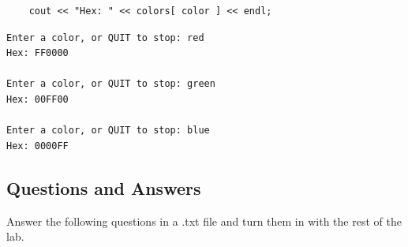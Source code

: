 \documentclass[a4paper,12pt]{book}
\begin{document}
\begin{verbatim}
    cout << "Hex: " << colors[ color ] << endl;
\end{verbatim}
        
\begin{lstlisting}[style=output]
Enter a color, or QUIT to stop: red
Hex: FF0000

Enter a color, or QUIT to stop: green
Hex: 00FF00

Enter a color, or QUIT to stop: blue
Hex: 0000FF
\end{lstlisting}

           
            \newpage
            \subsection*{Questions and Answers}
                Answer the following questions in a .txt file and
                turn them in with the rest of the lab.
\end{document}
